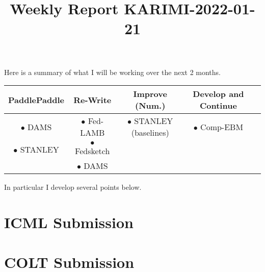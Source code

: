 \documentclass{article}
\begin{document}
\title{Weekly Report KARIMI-2022-01-21}


\date{}
\maketitle




Here is a summary of what I will be working over the next 2 months.

\begin{center}
\begin{tabular}{ |c|c|c|c|c| } 
\hline
PaddlePaddle & Re-Write & Improve (Num.)& Develop and Continue \\
\hline
$\bullet$ DAMS & $\bullet$ Fed-LAMB & $\bullet$ STANLEY (baselines) & $\bullet$ Comp-EBM\\ 
$\bullet$  STANLEY & $\bullet$ Fedsketch &  & \\ 
  & $\bullet$ DAMS &  & \\ 
\hline
\end{tabular}
\end{center}


In particular I develop several points below.

\section{ICML Submission}

\section{COLT Submission}





\end{document}
